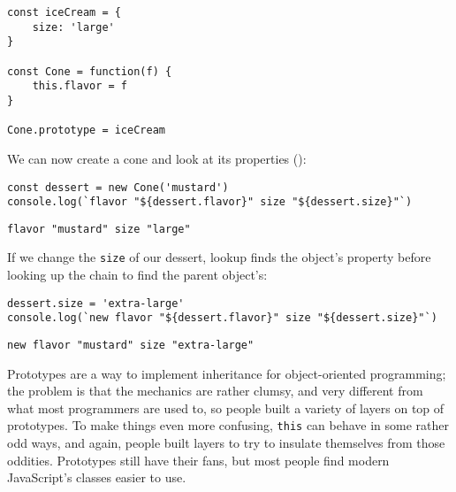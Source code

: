 \begin{verbatim}
const iceCream = {
    size: 'large'
}

const Cone = function(f) {
    this.flavor = f
}

Cone.prototype = iceCream
\end{verbatim}

We can now create a cone and look at its properties
():

\begin{verbatim}
const dessert = new Cone('mustard')
console.log(`flavor "${dessert.flavor}" size "${dessert.size}"`)
\end{verbatim}

\begin{verbatim}
flavor "mustard" size "large"
\end{verbatim}


If we change the \texttt{size} of our dessert,
lookup finds the object's property before looking up the chain to find the parent object's:

\begin{verbatim}
dessert.size = 'extra-large'
console.log(`new flavor "${dessert.flavor}" size "${dessert.size}"`)
\end{verbatim}

\begin{verbatim}
new flavor "mustard" size "extra-large"
\end{verbatim}

Prototypes are a way to implement inheritance for object-oriented programming;
the problem is that the mechanics are rather clumsy,
and very different from what most programmers are used to,
so people built a variety of layers on top of prototypes.
To make things even more confusing,
\texttt{this} can behave in some rather odd ways,
and again,
people built layers to try to insulate themselves from those oddities.
Prototypes still have their fans,
but most people find modern JavaScript's classes easier to use.
